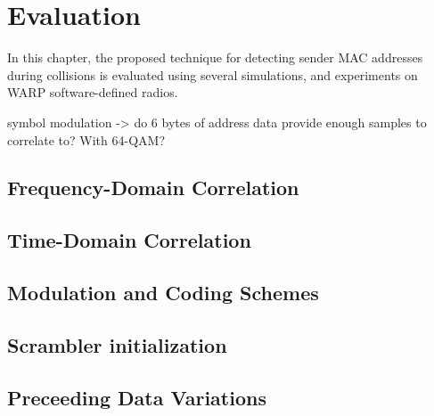 
\chapter{Evaluation}\label{ch:evaluation}
\glsresetall %

In this chapter, the proposed technique for detecting sender MAC addresses during collisions is evaluated using several simulations, and experiments on WARP software-defined radios.

symbol modulation -> do 6 bytes of address data provide enough samples to correlate to? With 64-QAM?



\section{Frequency-Domain Correlation}



\section{Time-Domain Correlation}\label{sec:freqd-correlation}



\section{Modulation and Coding Schemes}



\section{Scrambler initialization}\label{sec:ex-scrambler}



\section{Preceeding Data Variations}


